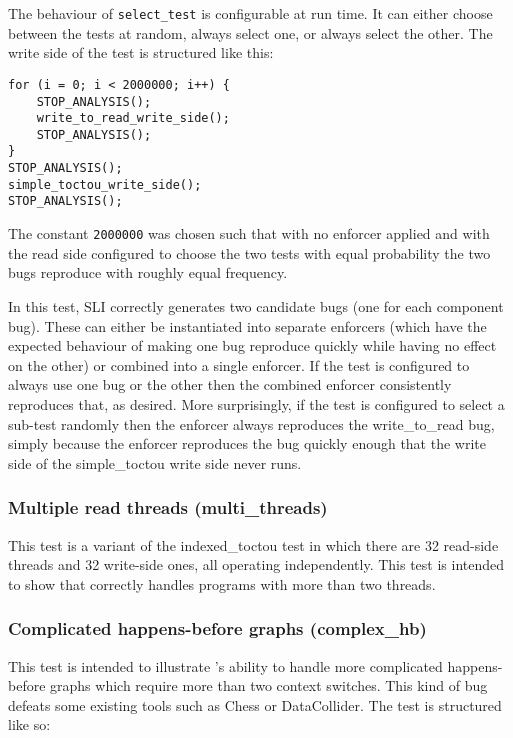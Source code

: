 The behaviour of \verb|select_test| is configurable at run time.  It
can either choose between the tests at random, always select one, or
always select the other.  The write side of the test is structured
like this:

\begin{verbatim}
for (i = 0; i < 2000000; i++) {
    STOP_ANALYSIS();
    write_to_read_write_side();
    STOP_ANALYSIS();
}
STOP_ANALYSIS();
simple_toctou_write_side();
STOP_ANALYSIS();
\end{verbatim}

The constant \verb|2000000| was chosen such that with no enforcer
applied and with the read side configured to choose the two tests with
equal probability the two bugs reproduce with roughly equal frequency.

In this test, SLI correctly generates two candidate bugs (one for each
component bug).  These can either be instantiated into separate
enforcers (which have the expected behaviour of making one bug
reproduce quickly while having no effect on the other) or combined
into a single enforcer.  If the test is configured to always use one
bug or the other then the combined enforcer consistently reproduces
that, as desired.  More surprisingly, if the test is configured to
select a sub-test randomly then the enforcer always reproduces the
write\_to\_read bug, simply because the enforcer reproduces the bug
quickly enough that the write side of the simple\_toctou write side
never runs.

\subsubsection{Multiple read threads (multi\_threads)}

This test is a variant of the indexed\_toctou test in which there are
32 read-side threads and 32 write-side ones, all operating
independently.  This test is intended to show that {\implementation}
correctly handles programs with more than two threads.

\subsubsection{Complicated happens-before graphs (complex\_hb)}

This test is intended to illustrate {\technique}'s ability to handle
more complicated happens-before graphs which require more than two
context switches.  This kind of bug defeats some existing tools such
as Chess\needCite{} or DataCollider\needCite{}.  The test is
structured like so:

